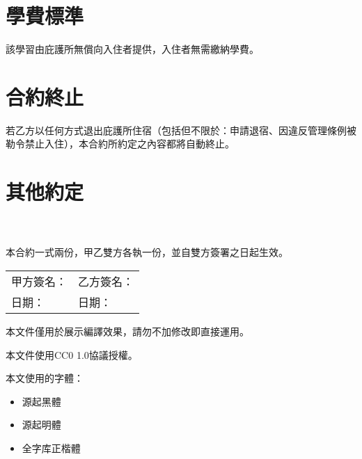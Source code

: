 \documentclass[12pt]{article}
\begin{document}
	\section{學費標準}
		該學習由庇護所無償向入住者提供，入住者無需繳納學費。
	\section{合約終止}
		若乙方以任何方式退出庇護所住宿（包括但不限於：申請退宿、因違反管理條例被勒令禁止入住），本合約所約定之內容都將自動終止。
	\section{其他約定}
	\noindent\underline{\hspace{15cm}}\\
	\underline{\hspace{15cm}}\\
	
	\vspace{2em}
	\noindent 本合約一式兩份，甲乙雙方各執一份，並自雙方簽署之日起生效。
	
	\vspace{3em}
	\begin{tabular}{p{7cm}p{7cm}}
		甲方簽名：\underline{\hspace{10em}} & 乙方簽名：\underline{\hspace{10em}} \\
		日期：\underline{\hspace{12em}} & 日期：\underline{\hspace{12em}} \\
	\end{tabular}
	
	\newpage
	本文件僅用於展示編譯效果，請勿不加修改即直接運用。

	本文件使用CC0 1.0協議授權。

	本文使用的字體：
	\begin{itemize}
		\item 源起黑體 %
		\item 源起明體 %
		\item 全字库正楷體 %
	\end{itemize}
\end{document}
